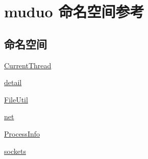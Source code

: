 \hypertarget{namespacemuduo}{}\section{muduo 命名空间参考}
\label{namespacemuduo}
\subsection*{命名空间}
\begin{DoxyCompactItemize}
\item 
 \hyperlink{namespacemuduo_1_1CurrentThread}{Current\+Thread}
\item 
 \hyperlink{namespacemuduo_1_1detail}{detail}
\item 
 \hyperlink{namespacemuduo_1_1FileUtil}{File\+Util}
\item 
 \hyperlink{namespacemuduo_1_1net}{net}
\item 
 \hyperlink{namespacemuduo_1_1ProcessInfo}{Process\+Info}
\item 
 \hyperlink{namespacemuduo_1_1sockets}{sockets}
\end{DoxyCompactItemize}
